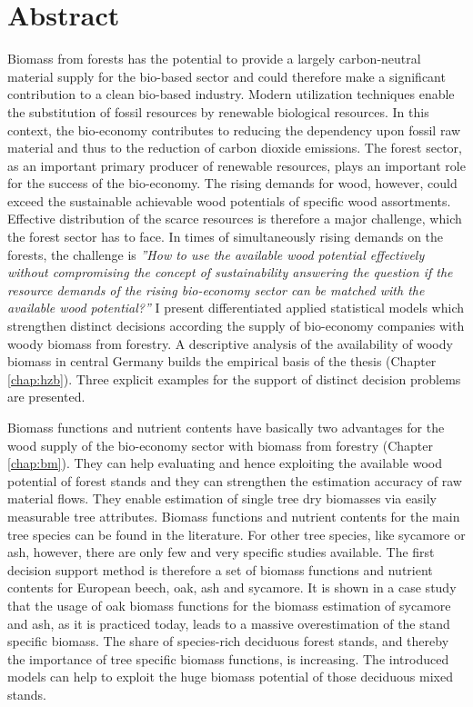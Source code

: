 \chapter*{Abstract}
\label{chap:Summary}
Biomass from forests has the potential to provide a largely carbon-neutral material supply for the bio-based sector and could therefore make a significant contribution to a clean bio-based industry. Modern utilization techniques enable the substitution of fossil resources by renewable biological resources. In this context, the bio-economy contributes to reducing the dependency upon fossil raw material and thus to the reduction of carbon dioxide emissions. The forest sector, as an important primary producer of renewable resources, plays an important role for the success of the bio-economy. The rising demands for wood, however, could exceed the sustainable achievable wood potentials of specific wood assortments. Effective distribution of the scarce resources is therefore a major challenge, which the forest sector has to face. In times of simultaneously rising demands on the forests, the challenge is \textit{''How to use the available wood potential effectively without compromising the concept of sustainability answering the question if the resource demands of the rising bio-economy sector can be matched with the available wood potential?''} I present differentiated applied statistical models which strengthen distinct decisions according the supply of bio-economy companies with woody biomass from forestry. A descriptive analysis of the availability of woody biomass in central Germany builds the empirical basis of the thesis (Chapter \ref{chap:hzb}). Three explicit examples for the support of distinct decision problems are presented.

Biomass functions and nutrient contents have basically two advantages for the wood supply of the bio-economy sector with biomass from forestry (Chapter \ref{chap:bm}). They can help evaluating and hence exploiting the available wood potential of forest stands and they can strengthen the estimation accuracy of raw material flows. They enable estimation of single tree dry biomasses via easily measurable tree attributes. Biomass functions and nutrient contents for the main tree species can be found in the literature. For other tree species, like sycamore or ash, however, there are only few and very specific studies available. The first decision support method is therefore a set of biomass functions and nutrient contents for European beech, oak, ash and sycamore. It is shown in a case study that the usage of oak biomass functions for the biomass estimation of sycamore and ash, as it is practiced today, leads to a massive overestimation of the stand specific biomass. The share of species-rich deciduous forest stands, and thereby the importance of tree specific biomass functions, is increasing. The introduced models can help to exploit the huge biomass potential of those deciduous mixed stands.

